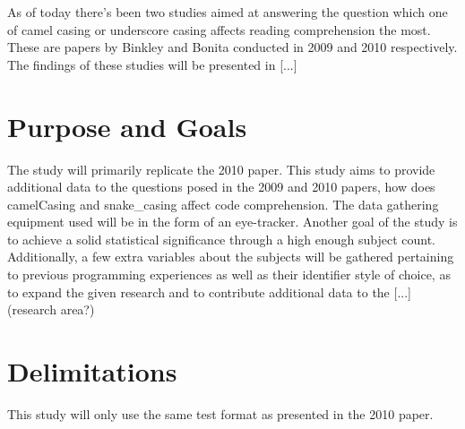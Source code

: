 As of today there's been two studies aimed at answering the question which one of camel casing or underscore casing affects reading comprehension the most. These are papers by Binkley \etal{} \cite{to-camelCase-or-under-score} and Bonita \etal{} \cite{eye-tracking-study} conducted in 2009 and 2010 respectively. The findings of these studies will be presented in [...]





\section{Purpose and Goals}
\iffalse
\begin{itemize}
	\item Write about the grand scheme of things
	\item Set the correct expectations
	\item What can I expect to learn if I keep on reading?
	\item What are the success criteria for this work?
	\item How will the work be evaluated?
\end{itemize}
\fi

The study will primarily replicate the 2010 paper. This study aims to provide additional data to the questions posed in the 2009 and 2010 papers, \eg{} how does camelCasing and snake\_casing affect code comprehension. The data gathering equipment used will be in the form of an eye-tracker. Another goal of the study is to achieve a solid statistical significance through a high enough subject count. Additionally, a few extra variables about the subjects will be gathered pertaining to previous programming experiences as well as their identifier style of choice, as to expand the given research and to contribute additional data to the [...] (research area?)


\section{Delimitations}
\iffalse
\begin{itemize}
	\item Scale down expectations and clarify
\end{itemize}
\fi
This study will only use the same test format as presented in the 2010 paper. 